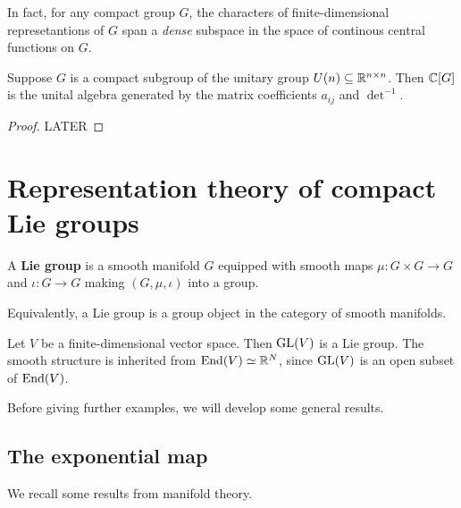 \documentclass[11pt, english]{article}
\begin{document}
In fact, for any compact group $G$, the characters of finite-dimensional represetantions of $G$ span a \emph{dense} subspace in the space of continous central functions on $G$. 

\begin{thm}
  Suppose $G$ is a compact subgroup of the unitary group $U(n) \subseteq \mathbb{R}^{n\times n}$. Then $\mathbb{C}[G]$ is the unital algebra generated by the matrix coefficients $a_{ij}$ and $\det^{-1}$. 
\end{thm}

\begin{proof}
  LATER
\end{proof}

\newpage
\section{Representation theory of compact Lie groups}

A \textbf{Lie group} is a smooth manifold $G$ equipped with smooth maps $\mu:G \times G \to G$ and $\iota:G \to G$ making $(G,\mu,\iota)$ into a group.

Equivalently, a Lie group is a group object in the category of smooth manifolds.

\begin{example}
 Let $V$ be a finite-dimensional vector space. Then $\operatorname{GL}(V)$ is a Lie group. The smooth structure is inherited from $\operatorname{End}(V) \simeq \mathbb{R}^N$, since $\operatorname{GL}(V)$ is an open subset of $\operatorname{End}(V)$.
\end{example}

Before giving further examples, we will develop some general results.

\subsection{The exponential map}

We recall some results from manifold theory.
\end{document}
